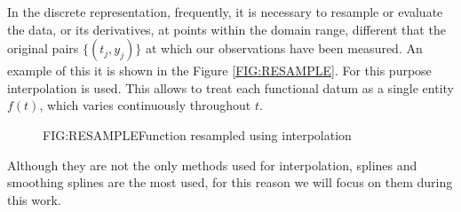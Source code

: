 
In the discrete representation, frequently, it is necessary to resample or
evaluate the data, or its derivatives, at points within the domain range,
different that the original pairs $\{(t_j, y_j)\}$ at which our observations
have been measured. An example of this it is shown in the Figure
\ref{FIG:RESAMPLE}. For this purpose interpolation is used.
This allows to treat each functional datum as a single entity $f(t)$, which
varies continuously throughout $t$.

\begin{figure}[Function resampled using interpolation]{FIG:RESAMPLE}{Function resampled using interpolation}

   \quad
\end{figure}

Although they are not the only methods used for interpolation, splines and
smoothing splines are the most used, for this reason we will focus on them
during this work.
